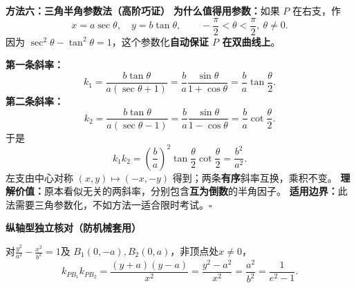 \clearpage
\begin{proofbox}
\textbf{\textcolor{CProof}{方法六：三角半角参数法（高阶巧证）}}
\textbf{为什么值得用参数：}如果 $P$ 在右支，作
\[
 x=a\sec\theta,\quad y=b\tan\theta,
 \qquad -\frac\pi2<\theta<\frac\pi2,\ \theta\ne0.
\]
因为 $\sec^2\theta-\tan^2\theta=1$，这个参数化\textbf{自动保证 $P$ 在双曲线上}。

\textbf{第一条斜率：}
\[
 k_1=\frac{b\tan\theta}{a(\sec\theta+1)}
 =\frac ba\frac{\sin\theta}{1+\cos\theta}
 =\boxed{\frac ba\tan\frac\theta2}.
\]
\textbf{第二条斜率：}
\[
 k_2=\frac{b\tan\theta}{a(\sec\theta-1)}
 =\frac ba\frac{\sin\theta}{1-\cos\theta}
 =\boxed{\frac ba\cot\frac\theta2}.
\]
于是
\[
 \boxed{k_1k_2=\left(\frac ba\right)^2
 \tan\frac\theta2\cot\frac\theta2=\frac{b^2}{a^2}}.
\]
左支由中心对称 $(x,y)\mapsto(-x,-y)$ 得到；两条\textbf{有序}斜率互换，乘积不变。
\textbf{理解价值：}原本看似无关的两斜率，分别包含\textbf{互为倒数}的半角因子。
\textbf{适用边界：}此法需要三角参数化，不如方法一适合限时考试。\quad\(\square\)
\end{proofbox}

\clearpage
\begin{proofbox}
\textbf{\textcolor{CProof}{纵轴型独立核对（防机械套用）}}
\begin{center}\end{center}

对\(\frac{y^2}{a^2}-\frac{x^2}{b^2}=1\)及
\(B_1(0,-a), B_2(0,a)\)，非顶点处\(x\ne0\)，
\[
 k_{PB_1}k_{PB_2}
 =\frac{(y+a)(y-a)}{x^2}
 =\frac{y^2-a^2}{x^2}
 =\frac{a^2}{b^2}=\frac{1}{e^2-1}.
\]
\end{proofbox}
